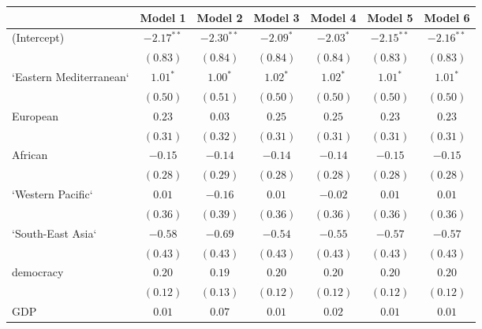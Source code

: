 
\begin{table}[!h]
\begin{center}
\begin{tabular}{l c c c c c c }
\toprule
 & Model 1 & Model 2 & Model 3 & Model 4 & Model 5 & Model 6 \\
\midrule
(Intercept)             & $-2.17^{**}$ & $-2.30^{**}$ & $-2.09^{*}$  & $-2.03^{*}$  & $-2.15^{**}$ & $-2.16^{**}$ \\
                        & $(0.83)$     & $(0.84)$     & $(0.84)$     & $(0.84)$     & $(0.83)$     & $(0.83)$     \\
`Eastern Mediterranean` & $1.01^{*}$   & $1.00^{*}$   & $1.02^{*}$   & $1.02^{*}$   & $1.01^{*}$   & $1.01^{*}$   \\
                        & $(0.50)$     & $(0.51)$     & $(0.50)$     & $(0.50)$     & $(0.50)$     & $(0.50)$     \\
European                & $0.23$       & $0.03$       & $0.25$       & $0.25$       & $0.23$       & $0.23$       \\
                        & $(0.31)$     & $(0.32)$     & $(0.31)$     & $(0.31)$     & $(0.31)$     & $(0.31)$     \\
African                 & $-0.15$      & $-0.14$      & $-0.14$      & $-0.14$      & $-0.15$      & $-0.15$      \\
                        & $(0.28)$     & $(0.29)$     & $(0.28)$     & $(0.28)$     & $(0.28)$     & $(0.28)$     \\
`Western Pacific`       & $0.01$       & $-0.16$      & $0.01$       & $-0.02$      & $0.01$       & $0.01$       \\
                        & $(0.36)$     & $(0.39)$     & $(0.36)$     & $(0.36)$     & $(0.36)$     & $(0.36)$     \\
`South-East Asia`       & $-0.58$      & $-0.69$      & $-0.54$      & $-0.55$      & $-0.57$      & $-0.57$      \\
                        & $(0.43)$     & $(0.43)$     & $(0.43)$     & $(0.43)$     & $(0.43)$     & $(0.43)$     \\
democracy               & $0.20$       & $0.19$       & $0.20$       & $0.20$       & $0.20$       & $0.20$       \\
                        & $(0.12)$     & $(0.13)$     & $(0.12)$     & $(0.12)$     & $(0.12)$     & $(0.12)$     \\
GDP                     & $0.01$       & $0.07$       & $0.01$       & $0.02$       & $0.01$       & $0.01$       \\

\end{tabular}
\end{center}
\end{table}

